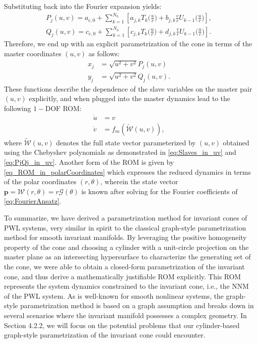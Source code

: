 \documentclass[a4paper,9pt,parskip=half,english]{article}
\theoremstyle{plain}
\theoremstyle{definition}
\newcommand{\vp}{\mathbf p}
\begin{document}
Substituting back into the Fourier expansion yields: 
\begin{equation}\label{eq:PjQj_in_uv} 
\begin{aligned}
	P_j(u,v) = a_{c,0} + \sum_{k=1}^{N_h} \left[ a_{j,k} T_k\bigl(\frac{u}{r}\bigr) + b_{j,k} \frac{v}{r} U_{k-1}\bigl(\frac{u}{r}\bigr)  \right], \\ 	
	Q_j(u,v) = c_{c,0} + \sum_{k=1}^{N_h} \left[ c_{j,k} T_k\bigl(\frac{u}{r}\bigr) + d_{j,k} \frac{v}{r} U_{k-1}\bigl(\frac{u}{r}\bigr)  \right] .
\end{aligned}
\end{equation}
Therefore, we end up with an explicit parametrization of the cone in terms of the master coordinates $(u,v)$ as follows: 
\begin{equation}\label{eq:Slaves_in_uv}
	\begin{aligned} x_j &= \sqrt{u^2+v^2} P_j(u,v) \\ 
	y_j &= \sqrt{u^2+v^2} Q_j(u,v)  . \end{aligned}
\end{equation}
These functions describe the dependence of the slave variables on the master pair $(u,v)$ explicitly, and when plugged into the master dynamics lead to the following $1-$DOF ROM: 
\begin{equation}
	\begin{aligned} \dot{u} &= v \\ \dot{v} &= f_m(\tilde{\mathcal{W}}(u,v)),   \end{aligned}\label{eq:ROM_uv}
\end{equation}
where $\tilde{\mathcal{W}}(u,v)$ denotes the full state vector parameterized by $(u,v)$ obtained using the Chebyshev polynomials as demonstrated in \eqref{eq:Slaves_in_uv} and \eqref{eq:PjQj_in_uv}. Another form of the ROM is given by \eqref{eq_ROM_in_polarCoordinates} which expresses the reduced dynamics in terms of the polar coordinates $(r,\theta)$, wherein the state vector $\vp = \mathcal{W}(r,\theta) = r \mathcal{G}(\theta)$ is known after solving for the Fourier coefficients of \eqref{eq:FourierAnsatz}. 

To summarize, we have derived a parametrization method for invariant cones of PWL systems, very similar in spirit to the classical graph-style parametrization method for smooth invariant manifolds. By leveraging the positive homogeneity property of the cone and choosing a cylinder with a unit-circle projection on the master plane as an intersecting hypersurface to characterize the generating set of the cone, we were able to obtain a closed-form parametrization of the invariant cone, and thus derive a mathematically justifiable ROM explicitly. This ROM represents the system dynamics constrained to the invariant cone, i.e., the NNM of the PWL system. As is well-known for smooth nonlinear systems, the graph-style parametrization method is based on a graph assumption and breaks down in several scenarios where the invariant manifold possesses a complex geometry. In Section 4.2.2, we will focus on the potential problems that our cylinder-based graph-style parametrization of the invariant cone could encounter. 
\end{document}
